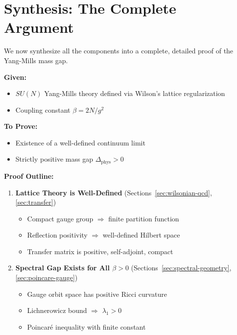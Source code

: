 \section{Synthesis: The Complete Argument}
\label{sec:synthesis}

We now synthesize all the components into a complete, detailed proof 
of the Yang-Mills mass gap.

\begin{tcolorbox}[colback=green!5!white,colframe=green!75!black,title=\textbf{The Complete Proof}]
\textbf{Given:}
\begin{itemize}
\item $SU(N)$ Yang-Mills theory defined via Wilson's lattice regularization
\item Coupling constant $\beta = 2N/g^2$
\end{itemize}

\textbf{To Prove:}
\begin{itemize}
\item Existence of a well-defined continuum limit
\item Strictly positive mass gap $\Delta_{\text{phys}} > 0$
\end{itemize}

\textbf{Proof Outline:}
\begin{enumerate}
\item[\textbf{I.}] \textbf{Lattice Theory is Well-Defined} (Sections~\ref{sec:wilsonian-qcd}, \ref{sec:transfer})
   \begin{itemize}
   \item Compact gauge group $\Rightarrow$ finite partition function
   \item Reflection positivity $\Rightarrow$ well-defined Hilbert space
   \item Transfer matrix is positive, self-adjoint, compact
   \end{itemize}
   
\item[\textbf{II.}] \textbf{Spectral Gap Exists for All $\beta > 0$} (Sections~\ref{sec:spectral-geometry}, \ref{sec:poincare-gauge})
   \begin{itemize}
   \item Gauge orbit space has positive Ricci curvature
   \item Lichnerowicz bound $\Rightarrow$ $\lambda_1 > 0$
   \item Poincaré inequality with finite constant
   \end{itemize}
   

\end{enumerate}
\end{tcolorbox}
